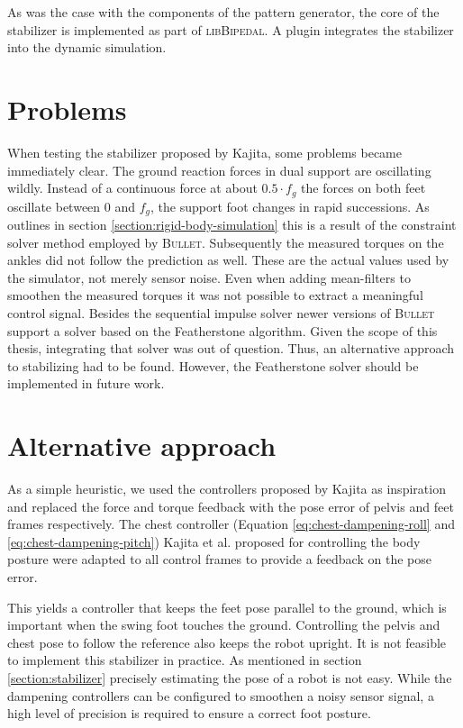 \documentclass[english,ngerman]{KITreprt}
\newcommand{\name}[1]{\textsc{#1}}
\begin{document}
As was the case with the components of the pattern generator, the core
of the stabilizer is implemented as part of \name{libBipedal}. A plugin
integrates the stabilizer into the dynamic simulation.

\section{Problems}\label{problems}

When testing the stabilizer proposed by Kajita, some problems became
immediately clear. The ground reaction forces in dual support are
oscillating wildly. Instead of a continuous force at about
$0.5 \cdot f_g$ the forces on both feet oscillate between $0$ and $f_g$,
the support foot changes in rapid successions. As outlines in section
\ref{section:rigid-body-simulation} this is a result of the constraint
solver method employed by \name{Bullet}. Subsequently the measured
torques on the ankles did not follow the prediction as well. These are
the actual values used by the simulator, not merely sensor noise. Even
when adding mean-filters to smoothen the measured torques it was not
possible to extract a meaningful control signal. Besides the sequential
impulse solver newer versions of \name{Bullet} support a solver based on
the Featherstone algorithm. Given the scope of this thesis, integrating
that solver was out of question. Thus, an alternative approach to
stabilizing had to be found. However, the Featherstone solver should be
implemented in future work.

\section{Alternative approach}\label{section:alternative-approach}

As a simple heuristic, we used the controllers proposed by Kajita as
inspiration and replaced the force and torque feedback with the pose
error of pelvis and feet frames respectively. The chest controller
(Equation \ref{eq:chest-dampening-roll} and
\ref{eq:chest-dampening-pitch}) Kajita et al. proposed for controlling
the body posture were adapted to all control frames to provide a
feedback on the pose error.

This yields a controller that keeps the feet pose parallel to the
ground, which is important when the swing foot touches the ground.
Controlling the pelvis and chest pose to follow the reference also keeps
the robot upright. It is not feasible to implement this stabilizer in
practice. As mentioned in section \ref{section:stabilizer} precisely
estimating the pose of a robot is not easy. While the dampening
controllers can be configured to smoothen a noisy sensor signal, a high
level of precision is required to ensure a correct foot posture.
\end{document}

